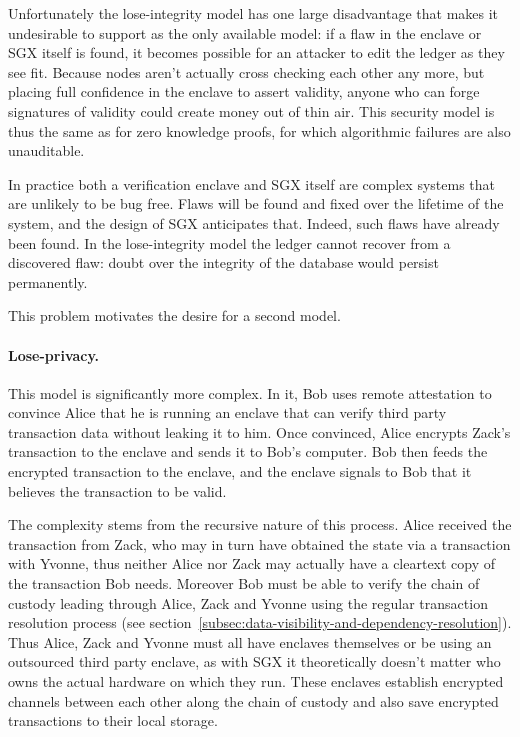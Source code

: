 \documentclass{article}
\begin{document}
Unfortunately the lose-integrity model has one large disadvantage that makes it undesirable to support as the
only available model: if a flaw in the enclave or SGX itself is found, it becomes possible for an attacker to edit
the ledger as they see fit. Because nodes aren't actually cross checking each other any more, but placing full
confidence in the enclave to assert validity, anyone who can forge signatures of validity could create money out of
thin air. This security model is thus the same as for zero knowledge proofs, for which algorithmic failures are
also unauditable.

In practice both a verification enclave and SGX itself are complex systems that are unlikely to be bug free. Flaws
will be found and fixed over the lifetime of the system, and the design of SGX anticipates that. Indeed, such flaws
have already been found. In the lose-integrity model the ledger cannot recover from a discovered flaw: doubt over
the integrity of the database would persist permanently.

This problem motivates the desire for a second model.

\paragraph{Lose-privacy.}This model is significantly more complex. In it, Bob uses remote attestation to convince
Alice that he is running an enclave that can verify third party transaction data without leaking it to him. Once
convinced, Alice encrypts Zack's transaction to the enclave and sends it to Bob's computer. Bob then feeds the
encrypted transaction to the enclave, and the enclave signals to Bob that it believes the transaction to be valid.

The complexity stems from the recursive nature of this process. Alice received the transaction from Zack, who may
in turn have obtained the state via a transaction with Yvonne, thus neither Alice nor Zack may actually have a
cleartext copy of the transaction Bob needs. Moreover Bob must be able to verify the chain of custody leading
through Alice, Zack and Yvonne using the regular transaction resolution process
(see section~\cref{subsec:data-visibility-and-dependency-resolution}). Thus Alice, Zack and Yvonne must all have
enclaves themselves or be using an outsourced third party enclave, as with SGX it theoretically doesn't matter
who owns the actual hardware on which they run. These enclaves establish encrypted channels between each other
along the chain of custody and also save encrypted transactions to their local storage.
\end{document}
